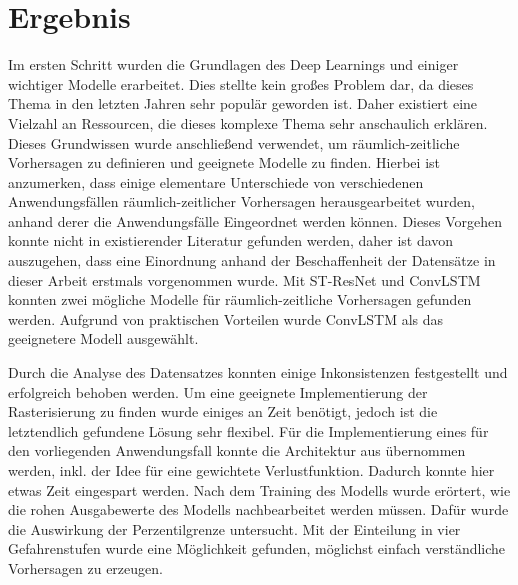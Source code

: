 \section{Ergebnis}
\label{sec:Ergebnis}
Im ersten Schritt wurden die Grundlagen des Deep Learnings und einiger wichtiger Modelle erarbeitet.
Dies stellte kein großes Problem dar, da dieses Thema in den letzten Jahren sehr populär geworden ist.
Daher existiert eine Vielzahl an Ressourcen, die dieses komplexe Thema sehr anschaulich erklären.
Dieses Grundwissen wurde anschließend verwendet, um räumlich-zeitliche Vorhersagen zu definieren und geeignete Modelle zu finden.
Hierbei ist anzumerken, dass einige elementare Unterschiede von verschiedenen Anwendungsfällen räumlich-zeitlicher Vorhersagen herausgearbeitet wurden, anhand derer die Anwendungsfälle Eingeordnet werden können.
Dieses Vorgehen konnte nicht in existierender Literatur gefunden werden, daher ist davon auszugehen, dass eine Einordnung anhand der Beschaffenheit der Datensätze in dieser Arbeit erstmals vorgenommen wurde.
Mit ST-ResNet und ConvLSTM konnten zwei mögliche Modelle für räumlich-zeitliche Vorhersagen gefunden werden.
Aufgrund von praktischen Vorteilen wurde ConvLSTM als das geeignetere Modell ausgewählt.

Durch die Analyse des Datensatzes konnten einige Inkonsistenzen festgestellt und erfolgreich behoben werden.
Um eine geeignete Implementierung der Rasterisierung zu finden wurde einiges an Zeit benötigt, jedoch ist die letztendlich gefundene Lösung sehr flexibel.
Für die Implementierung eines  für den vorliegenden Anwendungsfall konnte die Architektur aus \cite{CrimeConvLSTM} übernommen werden, inkl. der Idee für eine gewichtete Verlustfunktion.
Dadurch konnte hier etwas Zeit eingespart werden.
Nach dem Training des Modells wurde erörtert, wie die rohen Ausgabewerte des Modells nachbearbeitet werden müssen.
Dafür wurde die Auswirkung der Perzentilgrenze untersucht.
Mit der Einteilung in vier Gefahrenstufen wurde eine Möglichkeit gefunden, möglichst einfach verständliche Vorhersagen zu erzeugen.

